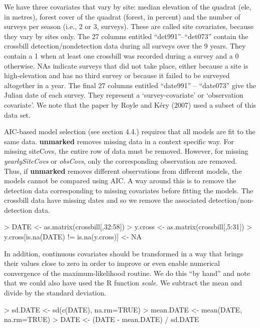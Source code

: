 \documentclass[12pt]{article}
\renewenvironment{Schunk}{\vspace{\topsep}}{\vspace{\topsep}}
\begin{document}
We have three covariates that vary by site: median elevation of the
quadrat (ele, in metres), forest cover of the quadrat (forest, in
percent) and the number of surveys per season (i.e., 2 or 3,
surveys).
These are called site covariates, because they vary by sites only.
The 27 columns entitled ``det991''--``det073'' contain the crossbill
detection/nondetection data during all surveys over the 9 years.
They contain a 1 when at least one crossbill was recorded during a
survey and a 0 otherwise.
NAs indicate surveys that did not take place, either because a site is
high-elevation and has no third survey or because it failed to be
surveyed altogether in a year.
The final 27 columns entitled ``date991'' -- ``date073'' give the Julian
date of each survey.
They represent a `survey-covariate' or `observation covariate'.
We note that the paper by Royle and K\'{e}ry (2007) used a subset of this
data set.

AIC-based model selection (see section 4.4.) requires
that all models are fit to the same data.
\textbf{unmarked} removes missing data in a context specific way. For
missing siteCovs, the entire row of data must be removed. However, for
missing \emph{yearlySiteCovs} or \emph{obsCovs}, only the
corresponding observation
are removed. Thus, if \textbf{unmarked} removes different observations
from different models, the models cannot be compared using AIC. A way
around this is to remove the detection data corresponding to
missing covariates before fitting the models.
The crossbill data have missing dates and so we remove the associated
detection/non-detection data.


\begin{Schunk}
\begin{Sinput}
> DATE <- as.matrix(crossbill[,32:58])
> y.cross <- as.matrix(crossbill[,5:31])
> y.cross[is.na(DATE) != is.na(y.cross)] <- NA
\end{Sinput}
\end{Schunk}

In addition, continuous covariates should be transformed in a way
that brings their values close to zero in order to improve
or even enable numerical convergence of the maximum-likelihood routine.
We do this ``by hand'' and note that we could also have used the R
function \emph{scale}. We subtract the mean and divide by the standard
deviation.

\begin{small}

\begin{Schunk}
\begin{Sinput}
> sd.DATE <- sd(c(DATE), na.rm=TRUE)
> mean.DATE <- mean(DATE, na.rm=TRUE)
> DATE <- (DATE - mean.DATE) / sd.DATE
\end{Sinput}
\end{Schunk}
\end{small}
\end{document}
